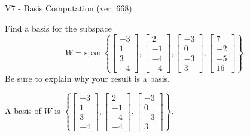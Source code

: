 \begin{exercise}
  \begin{exerciseTitle}V7 - Basis Computation (ver. 668)\end{exerciseTitle}
  \begin{exerciseStatement}
    Find a basis for the subspace 
\[W=\mathrm{span}\ \left\{\left[\begin{array}{r}
-3 \\
1 \\
3 \\
-4
\end{array}\right] , \left[\begin{array}{r}
2 \\
-1 \\
-4 \\
-4
\end{array}\right] , \left[\begin{array}{r}
-3 \\
0 \\
-3 \\
3
\end{array}\right] , \left[\begin{array}{r}
7 \\
-2 \\
-5 \\
16
\end{array}\right]\right\}.\]
 Be sure to explain why your result is a basis.


  \end{exerciseStatement}
  \begin{exerciseAnswer}
   A basis of \(W\) is  \(\left\{\left[\begin{array}{r}
-3 \\
1 \\
3 \\
-4
\end{array}\right] , \left[\begin{array}{r}
2 \\
-1 \\
-4 \\
-4
\end{array}\right] , \left[\begin{array}{r}
-3 \\
0 \\
-3 \\
3
\end{array}\right]\right\}\).
  


  \end{exerciseAnswer}
\end{exercise}